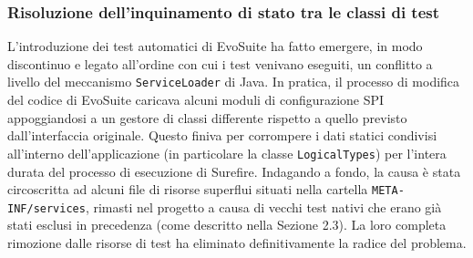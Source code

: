 \subsubsection{Risoluzione dell'inquinamento di stato tra le classi di test}
L'introduzione dei test automatici di EvoSuite ha fatto emergere, in modo discontinuo 
e legato all'ordine con cui i test venivano eseguiti, un conflitto a livello del meccanismo \texttt{ServiceLoader} di Java. 
In pratica, il processo di modifica del codice di EvoSuite caricava alcuni moduli di configurazione SPI 
appoggiandosi a un gestore di classi differente rispetto a quello previsto dall'interfaccia originale. 
Questo finiva per corrompere i dati statici condivisi all'interno dell'applicazione 
(in particolare la classe \texttt{LogicalTypes}) per l'intera durata del processo di esecuzione di Surefire. 
Indagando a fondo, la causa è stata circoscritta ad alcuni file di risorse superflui 
situati nella cartella \texttt{META-INF/services}, rimasti nel progetto a causa di vecchi test nativi 
che erano già stati esclusi in precedenza (come descritto nella Sezione 2.3). 
La loro completa rimozione dalle risorse di test ha eliminato definitivamente la radice del problema.